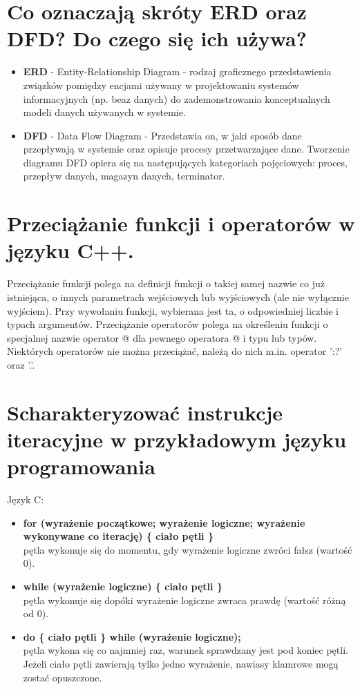 \documentclass[12pt,a4paper]{article}
\begin{document}
	\section{Co oznaczają skróty ERD oraz DFD? Do czego się ich używa?}
	\begin{itemize}
		\item \textbf{ERD} - Entity-Relationship Diagram - rodzaj graficznego przedstawienia związków pomiędzy encjami używany w projektowaniu systemów informacyjnych (np. beaz danych) do zademonstrowania konceptualnych modeli danych używanych w systemie.
		\item \textbf{DFD} - Data Flow Diagram - Przedstawia on, w jaki sposób dane przepływają w systemie oraz opisuje procesy przetwarzające dane. Tworzenie diagramu DFD opiera się na następujących kategoriach pojęciowych: proces, przepływ danych, magazyn danych, terminator.
	\end{itemize}

	\section{Przeciążanie funkcji i operatorów w języku C++.}
	\label{sec:przecfuncpp}
	Przeciążanie funkcji polega na definicji funkcji o takiej samej nazwie co już istniejąca, o innych parametrach wejściowych lub wyjściowych (ale nie wyłącznie wyjściem). Przy wywołaniu funkcji, wybierana jest ta, o odpowiedniej liczbie i typach argumentów.
	Przeciążanie operatorów polega na określeniu funkcji o specjalnej nazwie operator @ dla pewnego operatora @ i typu lub typów. Niektórych operatorów nie można przeciążać, należą do nich m.in. operator ':?' oraz '.'.

	\section{Scharakteryzować instrukcje iteracyjne w przykładowym języku programowania}
	Język C:
	\begin{itemize}
		\item \textbf{for (wyrażenie początkowe; wyrażenie logiczne; wyrażenie wykonywane co iterację) \{ ciało pętli \}}\\
		pętla wykonuje się do momentu, gdy wyrażenie logiczne zwróci fałsz (wartość 0).
	
		\item \textbf{while (wyrażenie logiczne) \{ ciało pętli \}}\\	
		pętla wykonuje się dopóki wyrażenie logiczne zwraca prawdę (wartość różną od 0).
		
		\item \textbf{do \{ ciało pętli \} while (wyrażenie logiczne);}\\
		pętla wykona się co najmniej raz, warunek sprawdzany jest pod koniec pętli. Jeżeli ciało pętli zawierają tylko jedno wyrażenie, nawiasy klamrowe mogą zostać opuszczone.
	\end{itemize}
\end{document}
